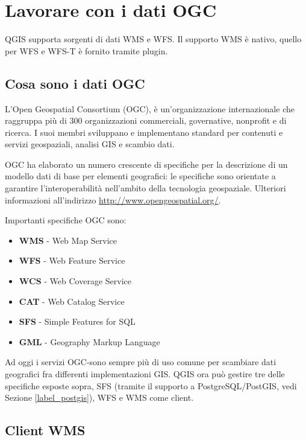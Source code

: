 \chapter{Lavorare con i dati OGC}\label{working_with_ogc}


QGIS supporta sorgenti di dati WMS e WFS. Il supporto WMS è nativo, quello per
WFS e WFS-T è fornito tramite plugin.

\section{Cosa sono i dati OGC}

L'Open Geospatial Consortium (OGC), è un'organizzazione internazionale che raggruppa più
di 300 organizzazioni commerciali, governative, nonprofit e di ricerca.
I suoi membri sviluppano e implementano standard per contenuti e servizi geospaziali,
analisi GIS e scambio dati.

OGC ha elaborato un numero crescente di specifiche per la descrizione di un modello dati di base 
per elementi geografici: le specifiche sono orientate a garantire l'interoperabilità
nell'ambito della tecnologia geospaziale. Ulteriori informazioni all'indirizzo \url{http://www.opengeospatial.org/}.

Importanti specifiche OGC sono:

\begin{itemize}[label=--]
\item \textbf{WMS} - Web Map Service
\item \textbf{WFS} - Web Feature Service
\item \textbf{WCS} - Web Coverage Service
\item \textbf{CAT} - Web Catalog Service
\item \textbf{SFS} - Simple Features for SQL
\item \textbf{GML} - Geography Markup Language
\end{itemize}

Ad oggi i servizi OGC-sono sempre più di uso comune per scambiare dati geografici fra
differenti implementazioni GIS. QGIS ora può gestire tre delle specifiche esposte sopra, 
SFS (tramite il supporto a PostgreSQL/PostGIS, vedi Sezione \ref{label_postgis}), WFS e WMS come client.

\section{Client WMS}\label{sec:ogc-wms}

